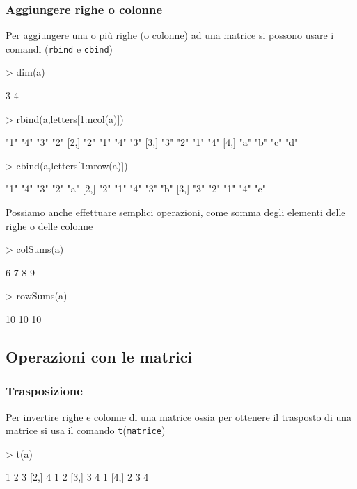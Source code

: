 \documentclass[onecolumn,11pt]{book}
\begin{document}
\subsubsection{Aggiungere righe o colonne}
Per aggiungere una o pi\`u righe (o colonne)
ad una matrice si possono usare i comandi (\texttt{rbind} e \texttt{cbind})
\begin{Schunk}
\begin{Sinput}
> dim(a)
\end{Sinput}
\begin{Soutput}
[1] 3 4
\end{Soutput}
\begin{Sinput}
> rbind(a,letters[1:ncol(a)])
\end{Sinput}
\begin{Soutput}
     [,1] [,2] [,3] [,4]
[1,] "1"  "4"  "3"  "2" 
[2,] "2"  "1"  "4"  "3" 
[3,] "3"  "2"  "1"  "4" 
[4,] "a"  "b"  "c"  "d" 
\end{Soutput}
\begin{Sinput}
> cbind(a,letters[1:nrow(a)])
\end{Sinput}
\begin{Soutput}
     [,1] [,2] [,3] [,4] [,5]
[1,] "1"  "4"  "3"  "2"  "a" 
[2,] "2"  "1"  "4"  "3"  "b" 
[3,] "3"  "2"  "1"  "4"  "c" 
\end{Soutput}
\end{Schunk}
Possiamo anche effettuare semplici operazioni, come somma degli elementi delle righe o delle colonne
\begin{Schunk}
\begin{Sinput}
> colSums(a)
\end{Sinput}
\begin{Soutput}
[1] 6 7 8 9
\end{Soutput}
\begin{Sinput}
> rowSums(a)
\end{Sinput}
\begin{Soutput}
[1] 10 10 10
\end{Soutput}
\end{Schunk}

\subsection{Operazioni con le matrici}
\subsubsection{Trasposizione}
Per invertire righe e colonne di una matrice ossia per ottenere il trasposto  di una matrice si usa il comando \texttt{t}(\texttt{matrice})
\begin{Schunk}
\begin{Sinput}
> t(a)
\end{Sinput}
\begin{Soutput}
     [,1] [,2] [,3]
[1,]    1    2    3
[2,]    4    1    2
[3,]    3    4    1
[4,]    2    3    4
\end{Soutput}
\end{Schunk}
\end{document}

